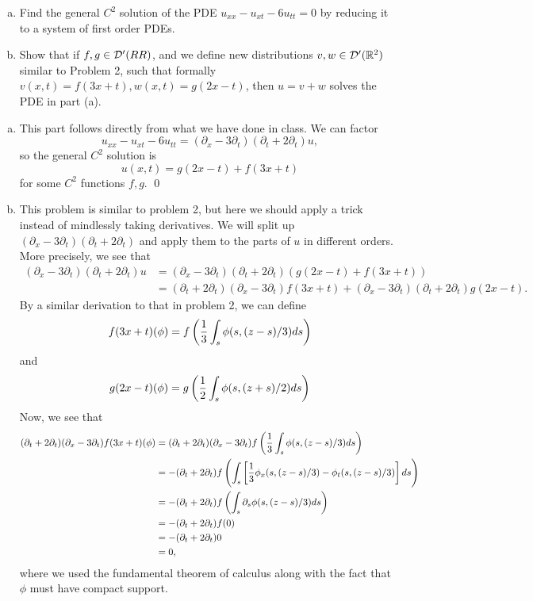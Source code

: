 \documentclass{article}
\renewcommand{\d}{\partial}
\begin{document}
\newpage
{} \begin{enumerate}[(a)]
    \item Find the general $C^2$ solution of the PDE $u_{xx} - u_{xt} - 6u_{tt} = 0$ by reducing it to a
    system of first order PDEs.
    \item Show that if $f,g \in \cal{D}'(RR)$, and we define new distributions $v,w \in \cal{D}'(\RR^2)$ similar to Problem 2,
    such that formally $v(x,t) = f(3x+ t), w(x,t) = g(2x- t)$, then $u = v + w$ solves the PDE in part (a).
\end{enumerate}
 \tri
\hop
\solution
\begin{enumerate}[(a)]
    \item This part follows directly from what we have done in class. We can factor 
    \[u_{xx}-u_{xt}-6u_{tt} = (\d_x - 3\d_t)(\d_t + 2\d_t)u,\]
    so the general $C^2$ solution is 
    \[u(x,t) = g(2x-t) + f(3x + t)\]
    for some $C^2$ functions $f,g$. \qed
    \item This problem is similar to problem 2, but here we should apply a trick instead of mindlessly taking derivatives. We will split up $ (\d_x - 3\d_t)(\d_t + 2\d_t)$ and apply them to the parts of $u$ in different orders. More precisely, we see that 
    \begin{align*}
        (\d_x - 3\d_t)(\d_t + 2\d_t)u &= (\d_x - 3\d_t)(\d_t + 2\d_t)( g(2x-t) + f(3x + t)) \\ 
        &= (\d_t + 2\d_t)(\d_x - 3\d_t)f(3x + t) +  (\d_x - 3\d_t)(\d_t + 2\d_t)g(2x-t).
    \end{align*}
    By a similar derivation to that in problem 2, we can define 
    \[f(3x+t)(\phi) = f\del{\frac{1}{3}\int_s \phi(s, (z-s)/3)ds}\]
    and 
    \[g(2x-t)(\phi) = g\del{\frac{1}{2}\int_s \phi(s, (z+s)/2)ds}\]
    Now, we see that 
    \begin{align*}
        (\d_t + 2\d_t)(\d_x - 3\d_t)f(3x + t)(\phi) &= (\d_t + 2\d_t)(\d_x - 3\d_t)f\del{\frac{1}{3}\int_s \phi(s, (z-s)/3)ds} \\
        &=-(\d_t + 2\d_t)f\del{\int_s \sbr{\frac{1}{3}\phi_x(s, (z-s)/3) - \phi_t(s, (z-s)/3)}ds}\\
        &= -(\d_t + 2\d_t)f\del{\int_s \d_s \phi(s, (z-s)/3)ds} \\
        &= -(\d_t + 2\d_t)f(0)\\
        &= -(\d_t + 2\d_t)0\\
        &=0,
    \end{align*}
    where we used the fundamental theorem of calculus along with the fact that $\phi$ must have compact support. 

\end{enumerate}
\end{document}
